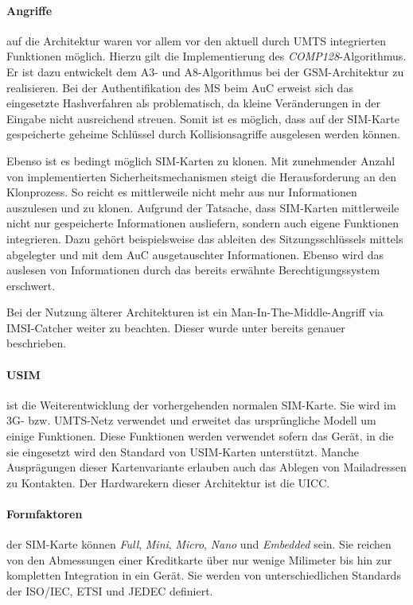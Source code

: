 \paragraph{Angriffe} auf die Architektur waren vor allem vor den aktuell durch UMTS
integrierten Funktionen möglich. Hierzu gilt die Implementierung des \textit{COMP128}-Algorithmus.
Er ist dazu entwickelt dem A3- und A8-Algorithmus bei der GSM-Architektur zu realisieren.
Bei der Authentifikation des \ac{MS} beim \ac{AuC} erweist sich das eingesetzte Hashverfahren
als problematisch, da kleine Veränderungen in der Eingabe nicht ausreichend streuen. Somit
ist es möglich, dass auf der SIM-Karte gespeicherte geheime Schlüssel durch Kollisionsagriffe
ausgelesen werden können.

Ebenso ist es bedingt möglich SIM-Karten zu klonen. Mit zunehmender Anzahl von implementierten
Sicherheitsmechanismen steigt die Herausforderung an den Klonprozess. So reicht es mittlerweile
nicht mehr aus nur Informationen auszulesen und zu klonen.
Aufgrund der Tatsache, dass SIM-Karten mittlerweile nicht nur gespeicherte Informationen
ausliefern, sondern auch eigene Funktionen integrieren.
Dazu gehört beispielsweise das ableiten des Sitzungsschlüssels
mittels abgelegter und mit dem \ac{AuC} ausgetauschter Informationen. Ebenso wird das auslesen
von Informationen durch das bereits erwähnte Berechtigungssystem erschwert.

Bei der Nutzung älterer Architekturen ist ein Man-In-The-Middle-Angriff via IMSI-Catcher weiter
zu beachten. Dieser wurde unter  bereits genauer beschrieben.

\paragraph{\ac{USIM}} ist die Weiterentwicklung der vorhergehenden normalen \ac{SIM}-Karte. Sie wird
im 3G- bzw. UMTS-Netz verwendet und erweitet das ursprüngliche Modell um einige Funktionen.
Diese Funktionen werden verwendet sofern das Gerät, in die sie eingesetzt wird den Standard
von USIM-Karten unterstützt. Manche Ausprägungen dieser Kartenvariante erlauben auch das Ablegen
von Mailadressen zu Kontakten. Der Hardwarekern dieser Architektur ist die \ac{UICC}.

\paragraph{Formfaktoren} der SIM-Karte können \textit{Full}, \textit{Mini}, \textit{Micro},
\textit{Nano} und \textit{Embedded} sein. Sie reichen von den Abmessungen einer Kreditkarte über
nur wenige Milimeter bis hin zur kompletten Integration in ein Gerät. Sie werden von unterschiedlichen
Standards der ISO/IEC, ETSI und JEDEC definiert.

